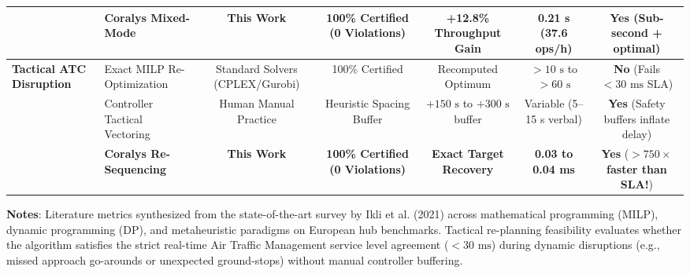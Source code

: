 \begin{table}[t]
{\begin{tabular}{llccccc}
& \textbf{Coralys Mixed-Mode} & \textbf{This Work} & \textbf{100\% Certified (0 Violations)} & \textbf{+12.8\% Throughput Gain} & \textbf{0.21 s (37.6 ops/h)} & \textbf{Yes} (Sub-second + optimal) \\
\midrule
\multirow{3}{*}{\textbf{Tactical ATC Disruption}}
& Exact MILP Re-Optimization & Standard Solvers (CPLEX/Gurobi) & 100\% Certified & Recomputed Optimum & $> 10\text{ s}$ to $> 60\text{ s}$ & \textbf{No} (Fails $<30\text{ ms}$ SLA) \\
& Controller Tactical Vectoring & Human Manual Practice & Heuristic Spacing Buffer & $+150\text{ s}$ to $+300\text{ s}$ buffer & Variable (5--15 s verbal) & \textbf{Yes} (Safety buffers inflate delay) \\
& \textbf{Coralys Re-Sequencing} & \textbf{This Work} & \textbf{100\% Certified (0 Violations)} & \textbf{Exact Target Recovery} & \textbf{0.03 to 0.04 ms} & \textbf{Yes} (\textbf{$>750\times$ faster than SLA!}) \\
\bottomrule
\end{tabular}%
}
\vspace{1mm}
\begin{flushleft}
\footnotesize{\textbf{Notes}: Literature metrics synthesized from the state-of-the-art survey by Ikli et al. (2021) \cite{ikli2021} across mathematical programming (MILP), dynamic programming (DP), and metaheuristic paradigms on European hub benchmarks. Tactical re-planning feasibility evaluates whether the algorithm satisfies the strict real-time Air Traffic Management service level agreement ($< 30\text{ ms}$) during dynamic disruptions (e.g., missed approach go-arounds or unexpected ground-stops) without manual controller buffering.}
\end{flushleft}
\end{table}
